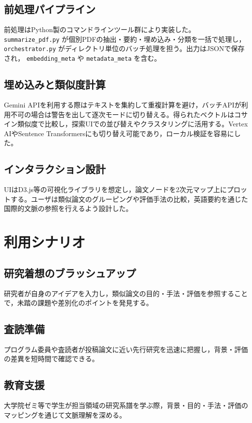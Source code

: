 \documentclass[twoside]{wiss}
\begin{document}
\subsection{前処理パイプライン}
前処理はPython製のコマンドラインツール群により実装した。 \texttt{summarize\_pdf.py} が個別PDFの抽出・要約・埋め込み・分類を一括で処理し， \texttt{orchestrator.py} がディレクトリ単位のバッチ処理を担う。出力はJSONで保存され， \texttt{embedding\_meta} や \texttt{metadata\_meta} を含む。

\subsection{埋め込みと類似度計算}
Gemini APIを利用する際はテキストを集約して重複計算を避け，バッチAPIが利用不可の場合は警告を出して逐次モードに切り替える。得られたベクトルはコサイン類似度で比較し，探索UIでの並び替えやクラスタリングに活用する。Vertex AIやSentence Transformersにも切り替え可能であり，ローカル検証を容易にした。

\subsection{インタラクション設計}
UIはD3.js等の可視化ライブラリを想定し，論文ノードを2次元マップ上にプロットする。ユーザは類似論文のグルーピングや評価手法の比較，英語要約を通じた国際的文脈の参照を行えるよう設計した。

\section{利用シナリオ}
\subsection{研究着想のブラッシュアップ}
研究者が自身のアイデアを入力し，類似論文の目的・手法・評価を参照することで，未踏の課題や差別化のポイントを発見する。

\subsection{査読準備}
プログラム委員や査読者が投稿論文に近い先行研究を迅速に把握し，背景・評価の差異を短時間で確認できる。

\subsection{教育支援}
大学院ゼミ等で学生が担当領域の研究系譜を学ぶ際，背景・目的・手法・評価のマッピングを通じて文脈理解を深める。
\end{document}
